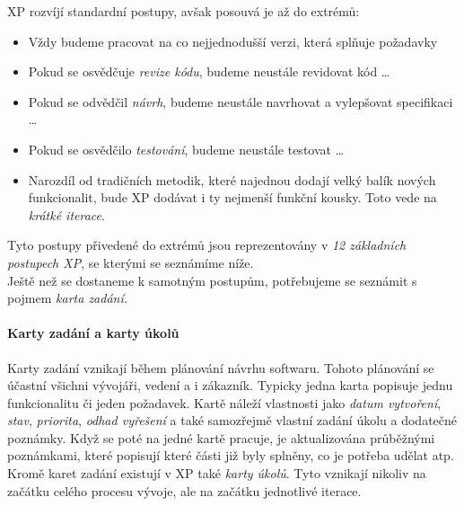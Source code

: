 XP rozvíjí standardní postupy, avšak posouvá je až do extrémů:
\begin{itemize}
	\item Vždy budeme pracovat na co nejjednodušší verzi, která splňuje požadavky
	\item Pokud se osvědčuje \emph{revize kódu}, budeme neustále revidovat kód \ldots
	\item Pokud se odvědčil \emph{návrh}, budeme neustále navrhovat a vylepšovat specifikaci \ldots
	\item Pokud se osvědčilo \emph{testování}, budeme neustále testovat \ldots
	\item Narozdíl od tradičních metodik, které najednou dodají velký balík nových funkcionalit, bude XP dodávat i ty nejmenší funkční kousky. Toto vede na \emph{krátké iterace}.
\end{itemize}

Tyto postupy přivedené do extrémů jsou reprezentovány v \emph{12 základních postupech XP}, se kterými se seznámíme níže.\\
Ještě než se dostaneme k samotným postupům, potřebujeme se seznámit s pojmem \emph{karta zadání.}

\paragraph{Karty zadání a karty úkolů} \label{methods:XP:issues}
Karty zadání vznikají během plánování návrhu softwaru. Tohoto plánování se účastní všichni vývojáři, vedení a i zákazník. Typicky jedna karta popisuje jednu funkcionalitu či jeden požadavek. Kartě náleží vlastnosti jako \emph{datum vytvoření}, \emph{stav}, \emph{priorita}, \emph{odhad vyřešení} a také samozřejmě vlastní zadání úkolu a dodatečné poznámky. Když se poté na jedné kartě pracuje, je aktualizována průběžnými poznámkami, které popisují které části již byly splněny, co je potřeba udělat atp.\\
Kromě karet zadání existují v XP také \emph{karty úkolů}. Tyto vznikají nikoliv na začátku celého procesu vývoje, ale na začátku jednotlivé iterace.


